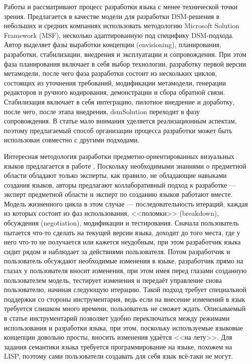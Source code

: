 Работы \cite{koznov2011process} и \cite{koznov2008development} рассматривают процесс 
разработки языка с менее технической точки зрения. Предлагается в качестве модели 
для разработки \ac{DSM}-решения в небольших и средних компаниях использовать методологию 
Microsoft Solution Framework (MSF), несколько адаптированную под специфику \ac{DSM}-подхода. 
Автор выделяет фазы выработки концепции (envisioning), планирования, разработки, стабилизации, 
внедрения и эксплуатации и сопровождения. При этом фаза планирования включает в себя выбор 
технологии, разработку первой версии метамодели, после чего фаза разработки состоит из нескольких 
циклов, состоящих из уточнения требований, модификации метамодели, генерации редакторов 
и ручного кодирования, демонстрации и сбора обратной связи. Стабилизация включает 
в себя интеграцию, пилотное внедрение и доработку, после чего, после этапа внедрения, 
\ac{dsmSolution} переходит в фазу сопровождения. В статье мало внимания уделяется реализационным 
аспектам, поэтому предлагаемый способ организации процесса разработки может быть использован 
совместно с другими подходами.

Интересная методология разработки предметно-ориентированных визуальных языков предлагается 
в работе \cite{repenning1995agentsheets}. Поскольку необходимыми знаниями о предметной 
области обладают только эксперты, как правило, не обладающие навыками создания языков, 
авторы предлагают коллаборативный подход к разработке --- эксперт предметной области 
и эксперт по созданию языков работают вместе. Модель жизненного цикла в этом случае 
--- последовательность итераций, каждая из которых состоит из фаз использования, <<поломки>> 
(breakdown), обсуждения (negotiation), модификации и тестирования. Сначала пользователь 
пытается что-то сделать на текущей версии языка, доходит до того места, где у него 
что-то не получается или кажется неудобным, при этом разработчик языка сидит рядом 
и наблюдает за действиями пользователя. Потом разработчик и пользователь обсуждают 
необходимые изменения в языке, разработчик прямо на глазах у пользователя вносит изменения, 
при этом имея перед глазами созданную пользователем модель, тестирует изменения и 
передаёт управление снова пользователю, начиная следующую итерацию. Такой подход требует 
специальной поддержки со стороны инструментария, ведь если на внесение изменений в 
язык требуется слишком много времени, пользователь не сможет ждать. Описываемый в 
статье инструментарий позволяет удобно переключаться между режимами использования и 
разработки языка, при этом, поскольку используемые языковые концепции довольно просты, 
вносить изменения удаётся <<на лету>>. Для задания семантики языка требуется программирование 
на языке, похожем на LISP, поэтому сами пользователи создавать для себя язык всё-таки 
не могут.

